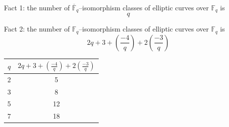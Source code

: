 \documentclass[12pt,handout]{beamer} %
\newcommand{\F}{\mathbb F}
\theoremstyle{definition}
\begin{document}
\begin{frame}

\begin{beamerboxesrounded}[upper=postit,lower=block body,shadow=true]{Fact 1: 
the number of $\overline{\F}_q$--isomorphism classes of elliptic curves over $\F_q$ is 
}
$$q$$
\end{beamerboxesrounded}\pause
\vfil

 \begin{beamerboxesrounded}[upper=postit,lower=block body,shadow=true]{Fact 2: 
the number of $\F_q$--isomorphism classes of elliptic curves over $\F_q$ is 
}
$$2q+3+\left(\frac{-4}{q}\right)+2\left(\frac{-3}{q}\right)$$
\end{beamerboxesrounded}
\vfil

\begin{center}
\begin{tabular}{|c|c|}
\hline
$q$ & $2q+3+\left(\frac{-4}{q}\right)+2\left(\frac{-3}{q}\right)$\\
\hline
2 & 5\\
3 & 8 \\ 
5 & 12 \\
7 & 18 \\
\hline
\end{tabular}
\end{center}


\end{frame}
\end{document}
